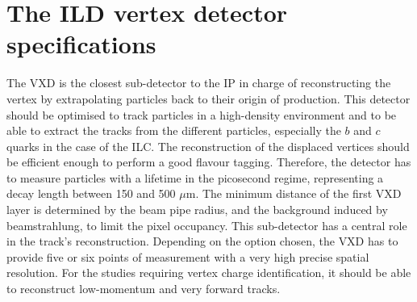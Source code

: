 







  \minitoc
  
  \section{The ILD vertex detector specifications}
   
    The \gls{VXD} is the closest sub-detector to the \acrfull{IP} in charge of reconstructing the vertex by extrapolating particles back to their origin of production. 
    This detector should be optimised to track particles in a high-density environment and to be able to extract the tracks from the different particles, especially the $b$ and $c$ quarks in the case of the \gls{ILC}.
    The reconstruction of the displaced vertices should be efficient enough to perform a good flavour tagging.
    Therefore, the detector has to measure particles with a lifetime in the picosecond regime, representing a decay length between 150 and 500 $\mu\text{m}$.
    The minimum distance of the first \gls{VXD} layer is determined by the beam pipe radius, and the background induced by beamstrahlung, to limit the pixel occupancy.
    This sub-detector has a central role in the track's reconstruction.
    Depending on the option chosen, the \gls{VXD} has to provide five or six points of measurement with a very high precise spatial resolution.
    For the studies requiring vertex charge identification, it should be able to reconstruct low-momentum and very forward tracks.
   

